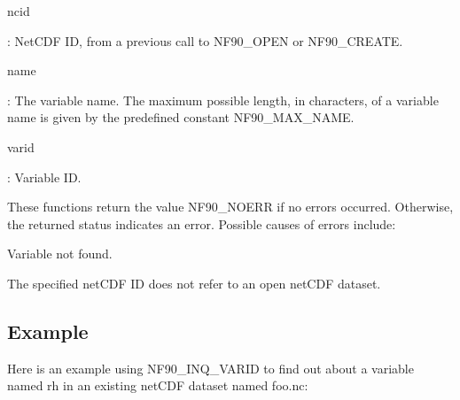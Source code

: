 {\ttfamily ncid}

\+: Net\+C\+DF ID, from a previous call to N\+F90\+\_\+\+O\+P\+EN or N\+F90\+\_\+\+C\+R\+E\+A\+TE.

{\ttfamily name}

\+: The variable name. The maximum possible length, in characters, of a variable name is given by the predefined constant N\+F90\+\_\+\+M\+A\+X\+\_\+\+N\+A\+ME.

{\ttfamily varid}

\+: Variable ID.

These functions return the value N\+F90\+\_\+\+N\+O\+E\+RR if no errors occurred. Otherwise, the returned status indicates an error. Possible causes of errors include\+:


\begin{DoxyItemize}
\item Variable not found.
\item The specified net\+C\+DF ID does not refer to an open net\+C\+DF dataset.
\end{DoxyItemize}

\subsection*{Example}

Here is an example using N\+F90\+\_\+\+I\+N\+Q\+\_\+\+V\+A\+R\+ID to find out about a variable named rh in an existing net\+C\+DF dataset named foo.\+nc\+:


